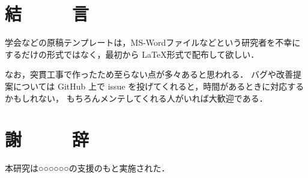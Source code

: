 \documentclass[year=2026]{sit}
\begin{document}
\section{結　　　言}\label{sec:conclusion}
学会などの原稿テンプレートは，MS-Wordファイルなどという研究者を不幸にするだけの形式ではなく，最初から \LaTeX 形式で配布して欲しい．

なお，突貫工事で作ったため至らない点が多々あると思われる．
バグや改善提案については GitHub 上で issue を投げてくれると，時間があるときに対応するかもしれない，
もちろんメンテしてくれる人がいれば大歓迎である．


\section*{謝　　　辞}
本研究は○○○○○○の支援のもと実施された．



\end{document}
